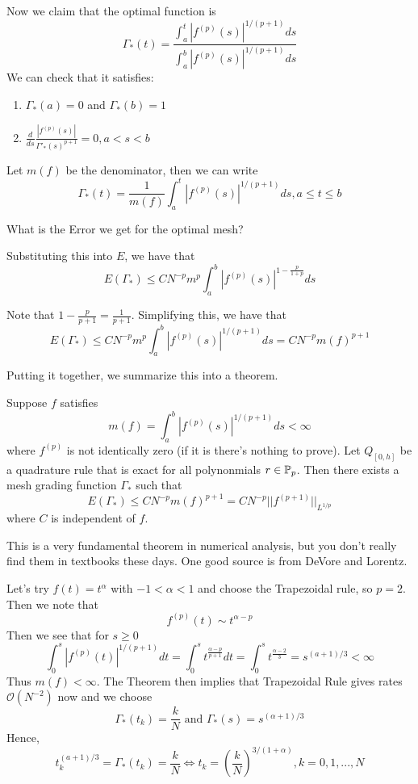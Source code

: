 \documentclass{article}
\begin{document}
Now we claim that the optimal function is
\[\Gamma_*(t) = \frac{\int_a^t |f^{(p)}(s)|^{1/(p+1)} ds}{\int_a^b |f^{(p)}(s)|^{1/(p+1)} ds}\]
We can check that it satisfies:
\begin{enumerate}
    \item $\Gamma_*(a) = 0$ and $\Gamma_*(b) = 1$
    \item $\frac{d}{ds} \frac{|f^{(p)}(s)|}{\Gamma'_*(s)^{p+1}} = 0, a < s < b$
\end{enumerate}

Let $m(f)$ be the denominator, then we can write
\[\Gamma_*(t) = \frac{1}{m(f)} \int_a^t |f^{(p)}(s)|^{1/(p+1)} ds, a \leq t \leq b\]

\begin{question}
    What is the Error we get for the optimal mesh?
\end{question}

Substituting this into $E$, we have that
\[E(\Gamma_*) \leq C N^{-p} m^p \int_a^b |f^{(p)}(s)|^{1 - \frac{p}{1+p}} ds\]

Note that $1 - \frac{p}{p+1} = \frac{1}{p+1}$. Simplifying this, we have that
\[E(\Gamma_*) \leq C N^{-p} m^p \int_a^b |f^{(p)}(s)|^{1/(p+1)} ds = C N^{-p} m(f)^{p+1}\]

Putting it together, we summarize this into a theorem.
\begin{theorem}
    Suppose $f$ satisfies
    \[m(f) = \int_a^b |f^{(p)}(s)|^{1/(p+1)} ds < \infty\]
    where $f^{(p)}$ is not identically zero (if it is there's nothing to prove). Let $Q_{[0, h]}$ be a quadrature rule that is exact for all polynonmials $r \in \mathbb{P}_p$. Then there exists a mesh grading function $\Gamma_*$ such that
    \[E(\Gamma_*) \leq C N^{-p} m(f)^{p+1} = C N^{-p} ||f^{(p+1)}||_{L^{1/p}}\]
    where $C$ is independent of $f$.
\end{theorem}

\begin{remark}
    This is a very fundamental theorem in numerical analysis, but you don't really find them in textbooks these days. One good source is from DeVore and Lorentz.
\end{remark}

\begin{example}
    Let's try $f(t) = t^\alpha$ with $-1 < \alpha < 1$ and choose the Trapezoidal rule, so $p = 2$. Then we note that
    \[f^{(p)}(t) \sim t^{\alpha - p}\]
    Then we see that for $s \geq 0$
    \[\int_0^s |f^{(p)}(t)|^{1/(p+1)} dt = \int_0^s t^{\frac{\alpha - p}{p+1}} dt = \int_0^s t^{\frac{\alpha - 2}{3}} = s^{(a+1)/3} < \infty \]
    Thus $m(f) < \infty$. The Theorem then implies that Trapezoidal Rule gives rates $\mathcal{O}(N^{-2})$ now and we choose
    \[\Gamma_*(t_k) = \frac{k}{N} \text{ and } \Gamma_*(s) = s^{(\alpha + 1)/3}\]
    Hence,
    \[t_k^{(a + 1)/3} = \Gamma_*(t_k) = \frac{k}{N} \iff t_k = (\frac{k}{N})^{3/(1 + \alpha)}, k = 0, 1, ..., N\]
\end{example}
\end{document}
